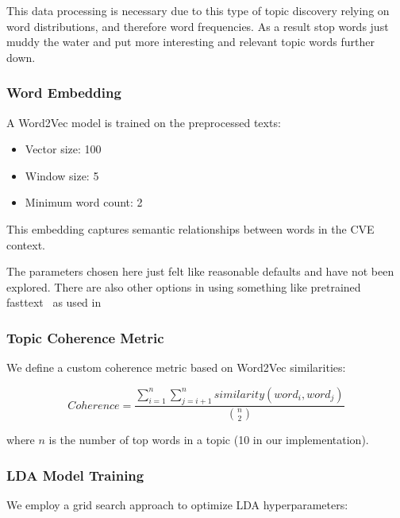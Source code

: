\documentclass[12pt]{article}
\begin{document}
This data processing is necessary due to this type of topic discovery relying on word distributions,
and therefore word frequencies. As a result stop words just muddy the water and put more interesting
and relevant topic words further down.

\subsubsection{Word Embedding}

A Word2Vec model is trained on the preprocessed texts:

\begin{itemize} \item Vector size: 100 \item Window size: 5 \item Minimum word count: 2
\end{itemize}

This embedding captures semantic relationships between words in the CVE context.

The parameters chosen here just felt like reasonable defaults and have not been explored. There are
also other options in using something like pretrained fasttext~\cite{fasttext} as used in
\cite{nvd_clustering_fasttext}


\subsubsection{Topic Coherence Metric}

We define a custom coherence metric based on Word2Vec similarities:

\begin{equation}
	Coherence = \frac{\sum_{i=1}^{n}\sum_{j=i+1}^{n} similarity(word_i, word_j)}{\binom{n}{2}}
\end{equation}

where $n$ is the number of top words in a topic (10 in our implementation).

\subsubsection{LDA Model Training}


We employ a grid search approach to optimize LDA hyperparameters:
\end{document}
